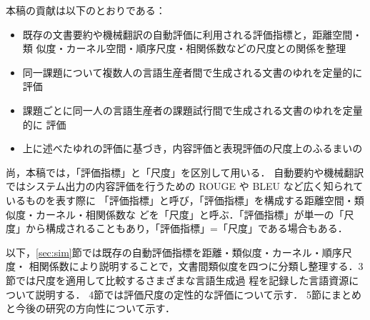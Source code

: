 \documentclass[japanese]{jnlp_1.4}
\newcommand{\modified}[1]{}
\begin{document}
\modified{
自動要約評価のための参照文書は一般に口述筆記の専門家や記者経験者などにより作
成され，統制された少数のものが提供される．
自動翻訳評価においても職業翻訳家等により限られた数の参照文書が作成される．
統制は距離空間上の凸問題として課題を設定し，
その課題設定の枠組内で評価したい工学研究者の都合で行われているものである．
さらに，工学研究者は参照文書の差異がユークリッド距離空間上に規定され，文書間類
似度で比較可能なレベルで統制できうるものだと考えているきらいがある．
一方，文書を介したコミュニケーションにおいて，言語生産者ではない者による受容過程は統制されるものではなく，複数の受容者間で共有されるものではない．一人の受容
者においても時間的経過などで統制できるものでもない．本稿では，人間の要約作成時の
不安定な言語受容過程\footnote{ここで言語受容過程とは，要約作成時に元文書を読む過
程のことを指す．}において文書の重要箇所選択がどの程度ゆれるものなのかを評価すると
ともに，そのゆれは評価指標を構成するどの尺度に表れるのかを調査する．この調査を通
して，本来誤りでないものが課題設定の時点で誤りになっている可能性があるという実態を明らかにする．}


本稿の貢献は以下のとおりである：
 \begin{itemize}
  \item 既存の文書要約や機械翻訳の自動評価に利用される評価指標と，距離空間・類
	似度・カーネル空間・順序尺度・相関係数などの尺度との関係を整理\modified{した}
  \item 同一課題について複数人の言語生産者間で生成される文書のゆれを定量的に評価
	\modified{した}
  \item 課題ごとに同一人の言語生産者の課題試行間で生成される文書のゆれを定量的に
	評価\modified{した}
  \item 上に述べたゆれの評価に基づき，内容評価と表現評価の尺度上のふるまいの\modified{不安定さを明らかにした}
 \end{itemize}

尚，本稿では，「評価指標」と「尺度」を区別して用いる．
自動要約や機械翻訳ではシステム出力の内容評価を行うための ROUGE や BLEU など広く知られているものを表す際に
「評価指標」と呼び，「評価指標」を構成する距離空間・類似度・カーネル・相関係数な
どを「尺度」と呼ぶ．「評価指標」が単一の「尺度」から構成されることもあり，「評価指標」=「尺度」である場合もある．

以下，\ref{sec:sim}節では既存の自動評価指標を距離・類似度・カーネル・順序尺度・
相関係数により説明することで，文書間類似度を四つに分類し整理する．3節では尺度を適用して比較するさまざまな言語生成過
程を記録した言語資源について説明する．
4節では評価尺度の定性的な評価について示す．
5節にまとめと今後の研究の方向性について示す．
\end{document}
